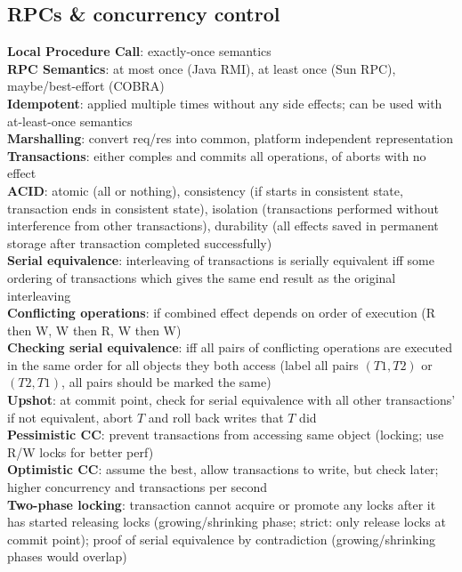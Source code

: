 \documentclass{article}
\begin{document}
\begin{multicols*}{3}
\section{RPCs \& concurrency control}
\textbf{Local Procedure Call}: exactly-once semantics \\
\textbf{RPC Semantics}: at most once (Java RMI), at least once (Sun RPC), maybe/best-effort (COBRA) \\
\textbf{Idempotent}: applied multiple times without any side effects; can be used with at-least-once semantics \\
\textbf{Marshalling}: convert req/res into common, platform independent representation \\
\textbf{Transactions}: either comples and commits all operations, of aborts with no effect \\
\textbf{ACID}: atomic (all or nothing), consistency (if starts in consistent state, transaction ends in consistent state), isolation (transactions performed without interference from other transactions), durability (all effects saved in permanent storage after transaction completed successfully) \\
\textbf{Serial equivalence}: interleaving of transactions is serially equivalent iff some ordering of transactions which gives the same end result as the original interleaving \\
\textbf{Conflicting operations}: if combined effect depends on order of execution (R then W, W then R, W then W) \\
\textbf{Checking serial equivalence}: iff all pairs of conflicting operations are executed in the same order for all objects they both access (label all pairs $(T1, T2)$ or $(T2, T1)$, all pairs should be marked the same) \\
\textbf{Upshot}: at commit point, check for serial equivalence with all other transactions' if not equivalent, abort $T$ and roll back writes that $T$ did \\
\textbf{Pessimistic CC}: prevent transactions from accessing same object (locking; use R/W locks for better perf) \\
\textbf{Optimistic CC}: assume the best, allow transactions to write, but check later; higher concurrency and transactions per second \\
\textbf{Two-phase locking}: transaction cannot acquire or promote any locks after it has started releasing locks (growing/shrinking phase; strict: only release locks at commit point); proof of serial equivalence by contradiction (growing/shrinking phases would overlap) \\

\end{multicols*}
\end{document}
